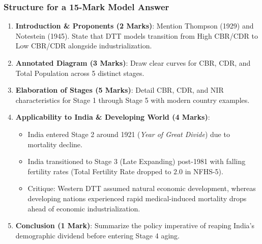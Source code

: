 \documentclass[11pt,a4paper]{article}
\begin{document}
\subsubsection{Structure for a 15-Mark Model Answer}
\begin{enumerate}[leftmargin=*]
  \item \textbf{Introduction \& Proponents (2 Marks)}: Mention Thompson (1929) and Notestein (1945). State that DTT models transition from High CBR/CDR to Low CBR/CDR alongside industrialization.
  \item \textbf{Annotated Diagram (3 Marks)}: Draw clear curves for CBR, CDR, and Total Population across 5 distinct stages.
  \item \textbf{Elaboration of Stages (5 Marks)}: Detail CBR, CDR, and NIR characteristics for Stage 1 through Stage 5 with modern country examples.
  \item \textbf{Applicability to India & Developing World (4 Marks)}:
  \begin{itemize}
    \item India entered Stage 2 around 1921 (\textit{Year of Great Divide}) due to mortality decline.
    \item India transitioned to Stage 3 (Late Expanding) post-1981 with falling fertility rates (Total Fertility Rate dropped to $2.0$ in NFHS-5).
    \item Critique: Western DTT assumed natural economic development, whereas developing nations experienced rapid medical-induced mortality drops ahead of economic industrialization.
  \end{itemize}
  \item \textbf{Conclusion (1 Mark)}: Summarize the policy imperative of reaping India's demographic dividend before entering Stage 4 aging.
\end{enumerate}
\end{document}
